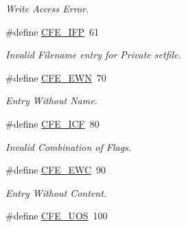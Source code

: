 \begin{CompactItemize}
\begin{CompactList}\small\item\em Write Access Error. \item\end{CompactList}\item 
\hypertarget{group__errors_g939964b690f63b5484ec40fe8a4a7c56}{
\#define \hyperlink{group__errors_g939964b690f63b5484ec40fe8a4a7c56}{CFE\_\-IFP}~61}
\label{group__errors_g939964b690f63b5484ec40fe8a4a7c56}

\begin{CompactList}\small\item\em Invalid Filename entry for Private setfile. \item\end{CompactList}\item 
\hypertarget{group__errors_gc2b94fe4fcdaa5cc608add42857fd178}{
\#define \hyperlink{group__errors_gc2b94fe4fcdaa5cc608add42857fd178}{CFE\_\-EWN}~70}
\label{group__errors_gc2b94fe4fcdaa5cc608add42857fd178}

\begin{CompactList}\small\item\em Entry Without Name. \item\end{CompactList}\item 
\hypertarget{group__errors_g8d3bbe7352edc6ec8ecf54150c80349f}{
\#define \hyperlink{group__errors_g8d3bbe7352edc6ec8ecf54150c80349f}{CFE\_\-ICF}~80}
\label{group__errors_g8d3bbe7352edc6ec8ecf54150c80349f}

\begin{CompactList}\small\item\em Invalid Combination of Flags. \item\end{CompactList}\item 
\hypertarget{group__errors_g5457a3ff93e8c6d02be9c1813038f795}{
\#define \hyperlink{group__errors_g5457a3ff93e8c6d02be9c1813038f795}{CFE\_\-EWC}~90}
\label{group__errors_g5457a3ff93e8c6d02be9c1813038f795}

\begin{CompactList}\small\item\em Entry Without Content. \item\end{CompactList}\item 
\hypertarget{group__errors_ge30643e906d0e1fdd31f11f9c1523a52}{
\#define \hyperlink{group__errors_ge30643e906d0e1fdd31f11f9c1523a52}{CFE\_\-UOS}~100}
\label{group__errors_ge30643e906d0e1fdd31f11f9c1523a52}


\end{CompactItemize}
